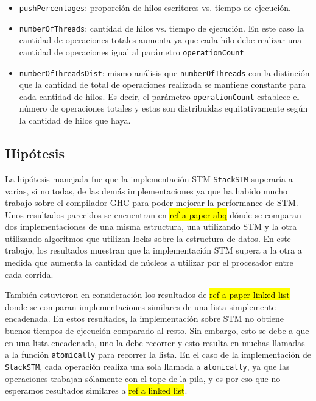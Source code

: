 \begin{itemize}
    \item \texttt{pushPercentages}: proporción de hilos escritores vs. tiempo de ejecución.
    \item \texttt{numberOfThreads}: cantidad de hilos vs. tiempo de ejecución. En este caso la cantidad de operaciones totales aumenta ya que cada hilo debe realizar una cantidad de operaciones igual al parámetro \texttt{operationCount}
    \item \texttt{numberOfThreadsDist}: mismo análisis que \texttt{numberOfThreads} con la distinción que la cantidad de total de operaciones realizada se mantiene constante para cada cantidad de hilos. Es decir, el parámetro \texttt{operationCount} establece el número de operaciones totales y estas son distribuídas equitativamente según la cantidad de hilos que haya.
\end{itemize}

\subsection{Hipótesis}\label{subsec:hypothesis}
La hipótesis manejada fue que la implementación STM \texttt{StackSTM} superaría a varias, si no todas, de las demás implementaciones ya que ha habido mucho trabajo sobre el compilador GHC para poder mejorar la performance de STM.
Unos resultados parecidos se encuentran en \hl{ref a paper-abq} dónde se comparan dos implementaciones de una misma estructura, una utilizando STM y la otra utilizando algoritmos que utilizan locks sobre la estructura de datos.
En este trabajo, los resultados muestran que la implementación STM supera a la otra a medida que aumenta la cantidad de núcleos a utilizar por el procesador entre cada corrida.

También estuvieron en consideración los resultados de \hl{ref a paper-linked-list} donde se comparan implementaciones similares de una lista simplemente encadenada.
En estos resultados, la implementación sobre STM no obtiene buenos tiempos de ejecución comparado al resto.
Sin embargo, esto se debe a que en una lista encadenada, uno la debe recorrer y esto resulta en muchas llamadas a la función \texttt{atomically} para recorrer la lista.
En el caso de la implementación de \texttt{StackSTM}, cada operación realiza una sola llamada a \texttt{atomically}, ya que las operaciones trabajan sólamente con el tope de la pila, y es por eso que no esperamos resultados similares a \hl{ref a linked list}.

